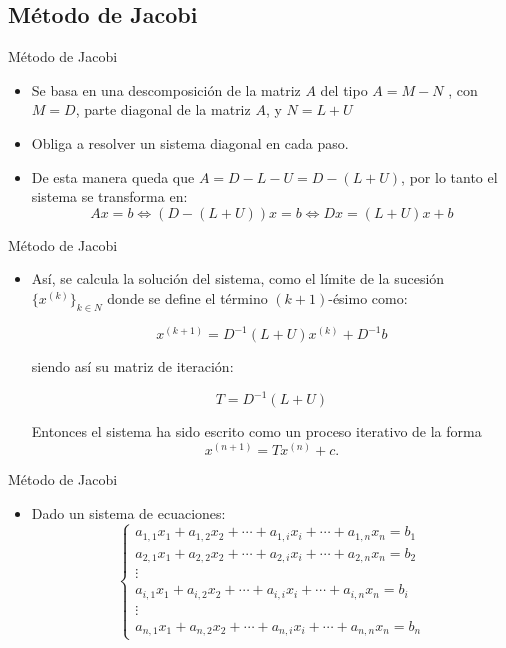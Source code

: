 \documentclass[10pt]{beamer}
\begin{document}
      \subsection{M\'etodo de Jacobi}      
      \begin{frame}{M\'etodo de Jacobi}
      \begin{itemize}
       \item Se basa en una descomposici\'on de la matriz $A$ del tipo $A = M - N$ , con $M = D$, parte diagonal de la matriz $A$, y $N = L + U$
       \item<2-> Obliga a resolver un sistema diagonal en cada paso.
       \item <3-> De esta manera queda que $A=D-L-U=D-(L+U)$, por lo tanto el sistema se transforma en:       
       $$
       Ax=b \Leftrightarrow (D-(L+U))x=b \Leftrightarrow Dx=(L+U)x + b
       $$
       \end{itemize}
      \end{frame}
      \begin{frame}{M\'etodo de Jacobi}
      \begin{itemize}
        \item<1-> As\'i, se calcula la soluci\'on del sistema, como el l\'imite de la sucesi\'on $\{x^{(k)}\}_{k \in N}$ donde se define el t\'ermino $(k+1)$-\'esimo como:
       
       $$
       x^{(k+1)}= D^{-1}(L+U)x^{(k)} + D^{-1}b
       $$
       
       siendo as\'i su matriz de iteraci\'on:
       
       $$
       T=D^{-1}(L+U)
       $$
       
       Entonces el sistema ha sido escrito como un proceso iterativo de la forma
       $$
       x^{(n+1)}= Tx^{(n)}+c .
       $$
      \end{itemize}
      \end{frame}
      \begin{frame}{M\'etodo de Jacobi}
      \begin{itemize}
       \item<1-> Dado un sistema de ecuaciones:
       $$
       \left\{\begin{array}{c}
               a_{1,1}x_1 + a_{1,2}x_2 + \cdots + a_{1,i}x_i + \cdots + a_{1,n}x_n = b_1\\
         a_{2,1}x_1 + a_{2,2}x_2 + \cdots + a_{2,i}x_i + \cdots + a_{2,n}x_n = b_2\\
                   \vdots\\
         a_{i,1}x_1 + a_{i,2}x_2 + \cdots + a_{i,i}x_i + \cdots + a_{i,n}x_n = b_i\\
                   \vdots\\
         a_{n,1}x_1 + a_{n,2}x_2 + \cdots + a_{n,i}x_i + \cdots + a_{n,n}x_n = b_n
              \end{array}
       \right.
       $$
      \end{itemize}
    \end{frame}
\end{document}
